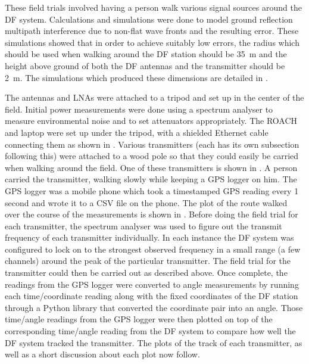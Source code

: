 These field trials involved having a person walk various signal sources around the DF system. Calculations and simulations were done to model ground reflection multipath interference due to non-flat wave fronts and the resulting error. These simulations showed that in order to achieve suitably low errors, the radius which should be used when walking around the DF station should be \SI{35}{\metre} and the height above ground of both the DF antennas and the transmitter should be \SI{2}{\meter}. The simulations which produced these dimensions are detailed in .

The antennas and LNAs were attached to a tripod and set up in the center of the field. Initial power measurements were done using a spectrum analyser to measure environmental noise and to set attenuators appropriately. The ROACH and laptop were set up under the tripod, with a shielded Ethernet cable connecting them as shown in . Various transmitters (each has its own subsection following this) were attached to a wood pole so that they could easily be carried when walking around the field. One of these transmitters is shown in . A person carried the transmitter, walking slowly while keeping a GPS logger on him. The GPS logger was a mobile phone which took a timestamped GPS reading every 1 second and wrote it to a CSV file on the phone. The plot of the route walked over the course of the measurements is shown in .
Before doing the field trial for each transmitter, the spectrum analyser was used to figure out the transmit frequency of each transmitter individually. In each instance the DF system was configured to lock on to the strongest observed frequency in a small range (a few channels) around the peak of the particular transmitter. The field trial for the transmitter could then be carried out as described above. Once complete, the readings from the GPS logger were converted to angle measurements by running each time/coordinate reading along with the fixed coordinates of the DF station through a Python library that converted the coordinate pair into an angle. Those time/angle readings from the GPS logger were then plotted on top of the corresponding time/angle reading from the DF system to compare how well the DF system tracked the transmitter. The plots of the track of each transmitter, as well as a short discussion about each plot now follow.


